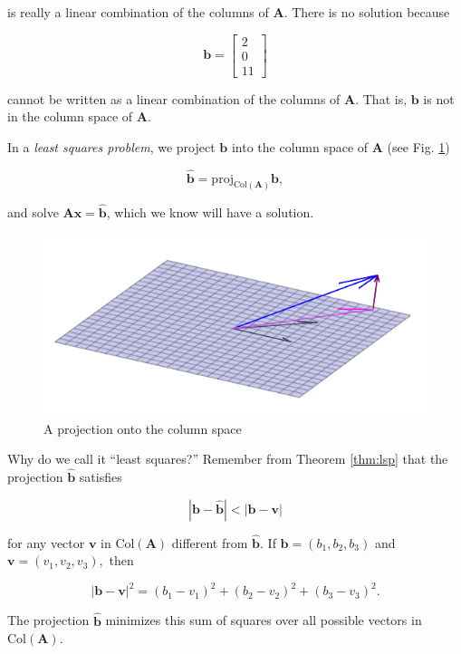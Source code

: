 \documentclass[
]{book}
\theoremstyle{definition}
\theoremstyle{definition}
\theoremstyle{definition}
\theoremstyle{definition}
\theoremstyle{remark}
\begin{document}
is really a linear combination of the columns of \(\mathbf{A}.\) There is no solution because

\[\mathbf{b}=\begin{bmatrix}2\\0\\11\end{bmatrix}\]

cannot be written as a linear combination of the columns of \(\mathbf{A}.\) That is, \(\mathbf{b}\) is not in the column space of \(\mathbf{A}.\)

In a \emph{least squares problem}, we project \(\mathbf{b}\) into the column space of \(\mathbf{A}\) (see Fig. \ref{fig:oproj2})

\[\hat{\mathbf{b}}=\text{proj}_{\text{Col}(\mathbf{A})}\mathbf{b},\]

and solve \(\mathbf{A}\mathbf{x}=\hat{\mathbf{b}}\), which we know will have a solution.

\begin{figure}

{\centering \includegraphics[width=0.75\linewidth]{images/lsqvec} 

}

\caption{A projection onto the column space}\label{fig:oproj2}
\end{figure}

Why do we call it ``least squares?'' Remember from Theorem \ref{thm:lsp} that the projection \(\hat{\mathbf{b}}\) satisfies

\[|\mathbf{b}-\hat{\mathbf{b}}|<|\mathbf{b}-\mathbf{v}|\]

for any vector \(\mathbf{v}\) in \(\text{Col}(\mathbf{A})\) different from \(\hat{\mathbf{b}}\). If \(\mathbf{b}=(b_1,b_2,b_3)\) and \(\mathbf{v}=(v_1,v_2,v_3),\) then

\[|\mathbf{b}-\mathbf{v}|^2=(b_1-v_1)^2+(b_2-v_2)^2+(b_3-v_3)^2.\]

The projection \(\hat{\mathbf{b}}\) minimizes this sum of squares over all possible vectors in \(\text{Col}(\mathbf{A})\).
\end{document}
